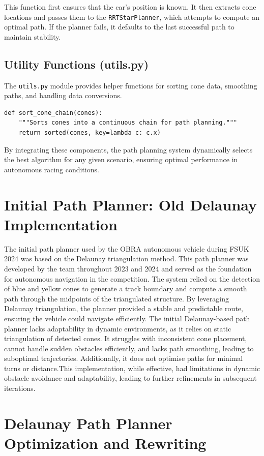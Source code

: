 \documentclass[a4paper,11pt]{report}
\begin{document}
This function first ensures that the car's position is known. It then extracts cone locations and passes them to the \texttt{RRTStarPlanner}, which attempts to compute an optimal path. If the planner fails, it defaults to the last successful path to maintain stability.

\subsection{Utility Functions (utils.py)}
The \texttt{utils.py} module provides helper functions for sorting cone data, smoothing paths, and handling data conversions.

\begin{verbatim}
def sort_cone_chain(cones):
    """Sorts cones into a continuous chain for path planning."""
    return sorted(cones, key=lambda c: c.x)
\end{verbatim}

By integrating these components, the path planning system dynamically selects the best algorithm for any given scenario, ensuring optimal performance in autonomous racing conditions.


\section{Initial Path Planner: Old Delaunay Implementation}
The initial path planner used by the OBRA autonomous vehicle during FSUK 2024 was based on the Delaunay triangulation method. This path planner was developed by the team throughout 2023 and 2024 and served as the foundation for autonomous navigation in the competition. The system relied on the detection of blue and yellow cones to generate a track boundary and compute a smooth path through the midpoints of the triangulated structure. By leveraging Delaunay triangulation, the planner provided a stable and predictable route, ensuring the vehicle could navigate efficiently. The initial Delaunay-based path planner lacks adaptability in dynamic environments, as it relies on static triangulation of detected cones. It struggles with inconsistent cone placement, cannot handle sudden obstacles efficiently, and lacks path smoothing, leading to suboptimal trajectories. Additionally, it does not optimise paths for minimal turns or distance.This implementation, while effective, had limitations in dynamic obstacle avoidance and adaptability, leading to further refinements in subsequent iterations.

\section{Delaunay Path Planner Optimization and Rewriting}
\end{document}
